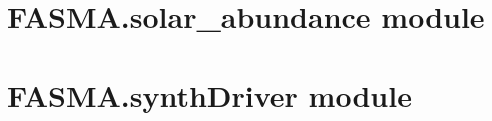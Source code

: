 \documentclass[letterpaper,10pt,english]{sphinxmanual}
\begin{document}
\section{FASMA.solar\_abundance module}
\label{\detokenize{index:module-FASMA.solar_abundance}}\label{\detokenize{index:fasma-solar-abundance-module}}

\section{FASMA.synthDriver module}
\label{\detokenize{index:module-FASMA.synthDriver}}\label{\detokenize{index:fasma-synthdriver-module}}
\end{document}
